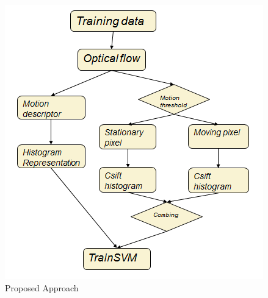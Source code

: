 \documentclass{sig-alternate-05-2015}
\begin{document}
\begin{figure}[h]
 \centering
  \includegraphics[scale=0.6]{fig/flow.png}
  \caption{Proposed Approach}
  \label{fig:flow}
\end{figure}
\end{document}
